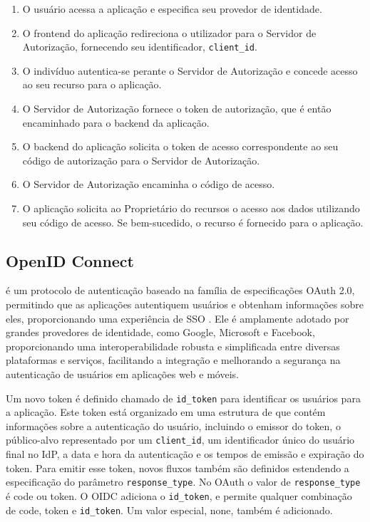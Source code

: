\begin{enumerate}

    \item O usuário acessa a aplicação e especifica seu provedor de identidade.
    
    \item O frontend do aplicação redireciona o utilizador para o Servidor de Autorização, fornecendo seu identificador, \texttt{client\_id}.
    
    \item O indivíduo autentica-se perante o Servidor de Autorização e concede acesso ao seu recurso para o aplicação.
    
    \item O Servidor de Autorização fornece o token de autorização, que é então encaminhado para o backend da aplicação.
    
    \item O backend do aplicação solicita o token de acesso correspondente ao seu código de autorização para o Servidor de Autorização.
    
    \item O Servidor de Autorização encaminha o código de acesso.
     
    \item O aplicação solicita ao Proprietário do recursos o acesso aos dados utilizando seu código de acesso. Se bem-sucedido, o recurso é fornecido para o aplicação.

    
\end{enumerate}

\subsection{OpenID Connect}\label{subsec:OIDC}

 é um protocolo de autenticação baseado na família de especificações OAuth 2.0, permitindo que as aplicações autentiquem usuários e obtenham informações sobre eles, proporcionando uma experiência de \acs{SSO} \cite{openid}. Ele é amplamente adotado por grandes provedores de identidade, como Google, Microsoft e Facebook, proporcionando uma interoperabilidade robusta e simplificada entre diversas plataformas e serviços, facilitando a integração e melhorando a segurança na autenticação de usuários em aplicações web e móveis.

Um novo token é definido chamado de \texttt{id\_token} para identificar os usuários para a aplicação. Este token está organizado em uma estrutura de  que contém informações sobre a autenticação do usuário, incluindo o emissor do token, o público-alvo representado por um \texttt{client\_id}, um identificador único do usuário final no IdP, a data e hora da autenticação e os tempos de emissão e expiração do token. Para emitir esse token, novos fluxos também são definidos estendendo a especificação do parâmetro \texttt{response\_type}. No OAuth o valor de \texttt{response\_type} é code ou token. O \acs{OIDC} adiciona o \texttt{id\_token}, e permite qualquer combinação de code, token e \texttt{id\_token}. Um valor especial, none, também é adicionado. 

